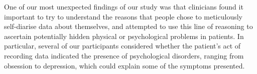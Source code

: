 \documentclass{sigchi}
\begin{document}




%

One of our most unexpected findings of our study was that clinicians found it important to try to understand the reasons that people chose to meticulously self-diarise data about themselves, and attempted to use this line of reasoning to ascertain potentially hidden physical or psychological problems in patients. In particular, several of our participants considered whether the patient's act of recording data indicated the presence of psychological disorders, ranging from obsession to depression, which could explain some of the symptoms presented. 
\end{document}
